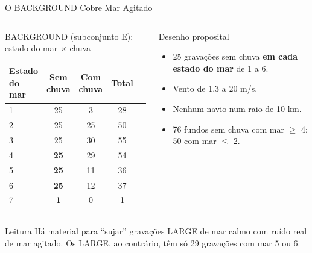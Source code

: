 \documentclass[aspectratio=169]{beamer}
\newcommand{\cahi}[1]{\cellcolor{green!30}\textbf{#1}}
\begin{document}
\begin{frame}{O BACKGROUND Cobre Mar Agitado}
    \footnotesize
    \begin{columns}[t]
        \begin{block}{\small BACKGROUND (subconjunto E): estado do mar $\times$ chuva}
            \tiny
            \centering
            \setlength{\tabcolsep}{4pt}
            \begin{tabular}{lcccc}
            \toprule
            Estado do mar & Sem chuva & Com chuva & Total \\
            \midrule
            1 & 25 & 3 & 28 \\
            2 & 25 & 25 & 50 \\
            3 & 25 & 30 & 55 \\
            4 & \cahi{25} & 29 & 54 \\
            5 & \cahi{25} & 11 & 36 \\
            6 & \cahi{25} & 12 & 37 \\
            7 & \cahi{1} & 0 & 1 \\
            \bottomrule
            \end{tabular}
        \end{block}
        \begin{block}{\small Desenho proposital}
            \scriptsize
            \begin{itemize}
                \setlength{\itemsep}{1pt}
                \item 25 gravações sem chuva \textbf{em cada estado do mar} de 1 a 6.
                \item Vento de 1,3 a 20 m/s.
                \item Nenhum navio num raio de 10 km.
                \item 76 fundos sem chuva com mar $\geq$ 4; 50 com mar $\leq$ 2.
            \end{itemize}
        \end{block}
    \end{columns}
    \begin{alertblock}{Leitura}
        \scriptsize
        Há material para ``sujar'' gravações LARGE de mar calmo com ruído real de mar agitado. Os LARGE, ao contrário, têm só 29 gravações com mar 5 ou 6.
    \end{alertblock}
\end{frame}
\end{document}
